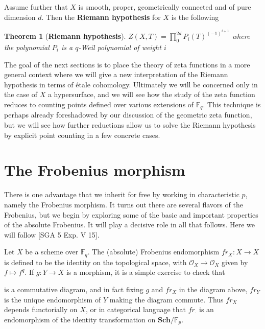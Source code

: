 \documentclass{ucbthesis}
\newtheorem{thm}{Theorem}[section]
\theoremstyle{definition}
\theoremstyle{theorem}
\begin{document}
Assume further that $X$ is smooth, proper, geometrically connected and of pure dimension $d$. Then the \textbf{Riemann hypothesis} for $X$ is the following

\begin{thm}[\textbf{Riemann hypothesis}]
$Z(X,T) = \prod\limits_{0}^{2d}P_{i}(T)^{(-1)^{i+1}}$ where the polynomial $P_{i}$ is a $q$-Weil polynomial of weight $i$
\end{thm}

The goal of the next sections is to place the theory of zeta functions in a more general context where we will give a new interpretation of the Riemann hypothesis in terms of \'{e}tale cohomology. Ultimately we will be concerned only in the case of $X$ a hypersurface, and we will see how the study of the zeta function reduces to counting points defined over various extensions of $\mathbb{F}_{q}$. This technique is perhaps already foreshadowed by our discussion of the geometric zeta function, but we will see how further reductions allow us to solve the Riemann hypothesis by explicit point counting in a few concrete cases. 

\section{The Frobenius morphism}
There is one advantage that we inherit for free by working in characteristic $p$, namely the Frobenius morphism. It turns out there are several flavors of the Frobenius, but we begin by exploring some of the basic and important properties of the absolute Frobenius. It will play a decisive role in all that follows.  Here we will follow  [SGA 5 Exp. V 15].

Let $X$ be a scheme over $\mathbb{F}_{q}$. The (absolute) Frobenius endomorphism $fr_{X}:X \rightarrow X$ is defined to be the identity on the topological space, with $\mathcal{O}_{X} \rightarrow \mathcal{O}_{X}$ given by $f \mapsto f^{q}$. If $g:Y\rightarrow X$ is a morphism, it is a simple exercise to check that 
\begin{center}
\end{center}
is a commutative diagram, and in fact fixing $g$ and $fr_{X}$ in the diagram above, $fr_{Y}$ is the unique endomorphism of $Y$ making the diagram commute. Thus $fr_{X}$ depends functorially on $X$, or in categorical language that $fr_{\cdot}$ is an endomorphism of the identity transformation on $\mathbf{Sch}/\mathbb{F}_{p}$. 
\end{document}
